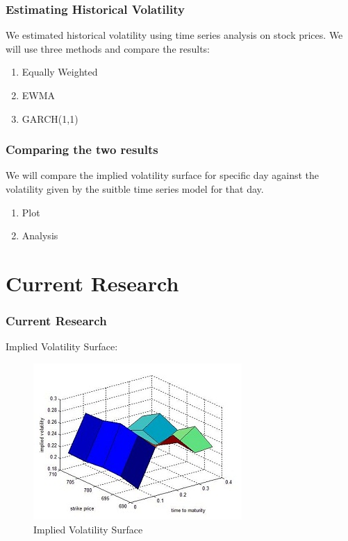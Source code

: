 \documentclass[compress,handout,10pt]{beamer}
\let\olditem\item
\renewcommand{\item}{\setlength{\itemsep}{0.5\baselineskip}\olditem}
\begin{document}
\begin{frame}
    \frametitle{Estimating Historical Volatility}
We estimated historical volatility using time series analysis on stock prices. We will use three methods and compare the results:     
\begin{enumerate}
        \item Equally Weighted
        \item EWMA
        \item GARCH(1,1)
         \end{enumerate}
\end{frame}


\begin{frame}
    \frametitle{Comparing the two results}
We will compare the implied volatility surface for specific day against the volatility given by the suitble time series model for that day.     
\begin{enumerate}
        \item Plot
        \item Analysis 
         \end{enumerate}
\end{frame}

\section{Current Research}
\begin{frame}
    \frametitle{Current Research}
Implied Volatility Surface:    
\begin{figure}[h]
    \begin{center}
        \includegraphics{volatility.jpg}
    \end{center}
    \caption{Implied Volatility Surface}
    \label{fig:master}
\end{figure}
\end{frame}

\end{document}
